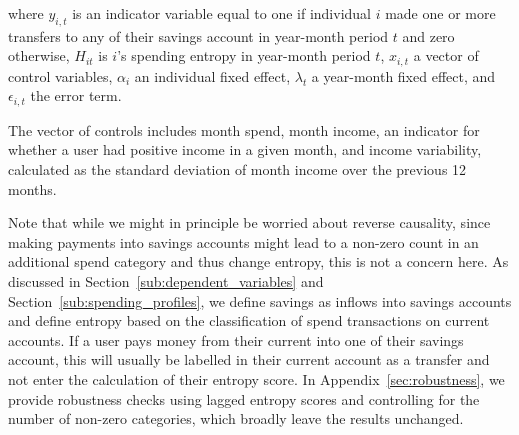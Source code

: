 \noindent where $y_{i,t}$ is an indicator variable equal to one if individual $i$ made
one or more transfers to any of their savings account in year-month period $t$ and zero
otherwise, $H_{it}$ is $i$'s spending entropy in year-month period $t$, $x_{i,t}$ a vector
of control variables, $\alpha_i$ an individual fixed effect, $\lambda_t$ a
year-month fixed effect, and $\epsilon_{i, t}$ the error term.

The vector of controls includes month spend, month income, an indicator for
whether a user had positive income in a given month, and income
variability, calculated as the standard deviation of month income over the
previous 12 months.

Note that while we might in principle be worried about reverse causality, since
making payments into savings accounts might lead to a non-zero count in an
additional spend category and thus change entropy, this is not a concern here.
As discussed in Section~\ref{sub:dependent_variables} and
Section~\ref{sub:spending_profiles}, we define savings as inflows into savings
accounts and define entropy based on the classification of spend transactions
on current accounts. If a user pays money from their current into one of their
savings account, this will usually be labelled in their current account as a
transfer and not enter the calculation of their entropy score. In
Appendix~\ref{sec:robustness}, we provide robustness checks using lagged
entropy scores and controlling for the number of non-zero categories, which
broadly leave the results unchanged.

